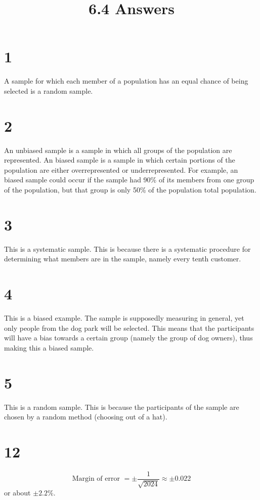 \documentclass{article}
\title{6.4 Answers}
\theoremstyle{definition}
\newcommand{\?}{\stackrel{?}{=}}
\begin{document}
\maketitle

\section*{1}
A sample for which each member of a population has an equal chance of being selected is a random sample.

\section*{2}
An unbiased sample is a sample in which all groups of the population are represented. An biased sample is a sample in which certain portions of the population are either 
overrepresented or underrepresented. For example, an biased sample could occur if the sample had 90\% of its members from one group of the population, but that group 
is only 50\% of the population total population.

\section*{3}
This is a systematic sample. This is because there is a systematic procedure for determining what members are in the sample, namely every tenth customer.

\section*{4}
This is a biased example. The sample is supposedly measuring  in general, yet only people from the dog park will be selected. This means that the 
participants will have a bias towards a certain group (namely the group of dog owners), thus making this a biased sample.

\section*{5}
This is a random sample. This is because the participants of the sample are chosen by a random method (choosing out of a hat).

\section*{12}
\[ \textrm{Margin of error }=\pm\frac{1}{\sqrt{2024}}\approx \pm 0.022 \] or about $\pm 2.2\%$.
\end{document}
